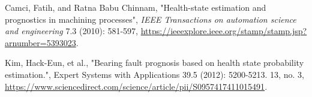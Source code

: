 \documentclass[11pt,a4paper]{article}
\begin{document}
\begin{section}
\begin{thebibliography}{9}
    {Camci, Fatih, and Ratna Babu Chinnam},
    "Health-state estimation and prognostics in machining processes",
    \textit{ IEEE Transactions on automation science and engineering}
    7.3 (2010): 581-597,
    \href{https://ieeexplore.ieee.org/stamp/stamp.jsp?arnumber=5393023}{https://ieeexplore.ieee.org/stamp/stamp.jsp?arnumber=5393023}.

    {{Kim, Hack-Eun, et} al.},
    "Bearing fault prognosis based on health state probability estimation.",
    Expert Systems with Applications 39.5 (2012): 5200-5213. 13,
    no. 3,
    \href{https://www.sciencedirect.com/science/article/pii/S0957417411015491}{https://www.sciencedirect.com/science/article/pii/S0957417411015491}.

    \end{thebibliography}
\end{section}

\newpage
\end{document}
